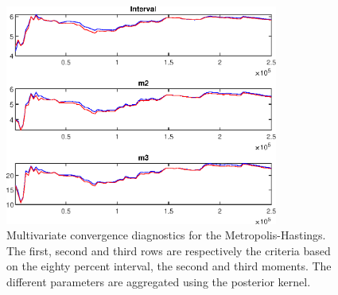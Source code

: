  
\begin{figure}[H]
\centering 
\includegraphics[width=0.8\textwidth]{BRS_imp_mobility_alt/Output/BRS_imp_mobility_alt_mdiag}
\caption{Multivariate convergence diagnostics for the Metropolis-Hastings.
The first, second and third rows are respectively the criteria based on
the eighty percent interval, the second and third moments. The different 
parameters are aggregated using the posterior kernel.}\label{Fig:MultivariateDiagnostics}
\end{figure}

